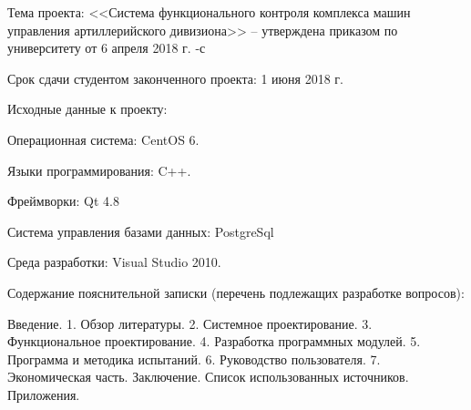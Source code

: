 {    %
	    \begin{legal}[leftmargin=*,label={\arabic*}]
	    \item Тема проекта: <<Система функционального контроля комплекса машин управления артиллерийского дивизиона>> --
		    утверждена приказом по университету от 6 апреля 2018 г. -с

		    \vspace{1em}

	    \item Срок сдачи студентом законченного проекта: 1 июня 2018 г.

		    \vspace{1em}

	    \item Исходные данные к проекту:

		    \begin{legal}[label*={.\arabic*}]
		    \item Операционная система: CentOS 6.
		    \item Языки программирования: C++.
		    \item Фреймворки: Qt 4.8
		    \item Система управления базами данных: PostgreSql
		    \item Среда разработки: Visual Studio 2010.
		    \end{legal}

		    \vspace{1em}

	    \item Содержание пояснительной записки (перечень подлежащих разработке вопросов):

		    Введение.
		    1. Обзор литературы.
		    2. Системное проектирование.
		    3. Функциональное проектирование.
		    4. Разработка программных модулей.
		    5. Программа и методика испытаний.
		    6. Руководство пользователя.
		    7. Экономическая часть.
		    Заключение.
		    Список использованных источников.
		    Приложения.

		    \vspace{1em}


\end{legal}}
